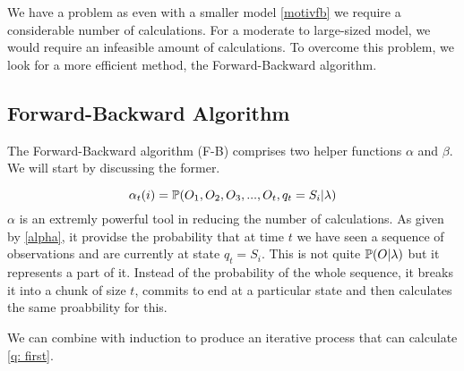 We have a problem as even with a smaller model \ref{motivfb} we require a considerable number of calculations. For a moderate to large-sized model, we would require an infeasible amount of calculations. To overcome this problem, we look for a more efficient method, the Forward-Backward algorithm.



\subsection{Forward-Backward Algorithm}
The Forward-Backward algorithm (F-B) comprises two helper functions $\alpha$ and $\beta$. We will start by discussing the former.

\begin{equation}
    \label{alpha}
    \alpha_t(i) = \mathbb{P} (O_1,O_2,O_3,...,O_t,q_t=S_i | \lambda)
\end{equation}
$\alpha$ is an extremly powerful tool in reducing the number of calculations. As given by \ref{alpha}, it providse the probability that at time $t$ we have seen a sequence of observations and are currently at state $q_t=S_i$. This is not quite $\mathbb{P} (O | \lambda)$ but it represents a part of it. Instead of the probability of the whole sequence, it breaks it into a chunk of size $t$, commits to end at a particular state and then calculates the same proabbility for this.

We can combine \label{alpha} with induction to produce an iterative process that can calculate \ref{q: first}.

